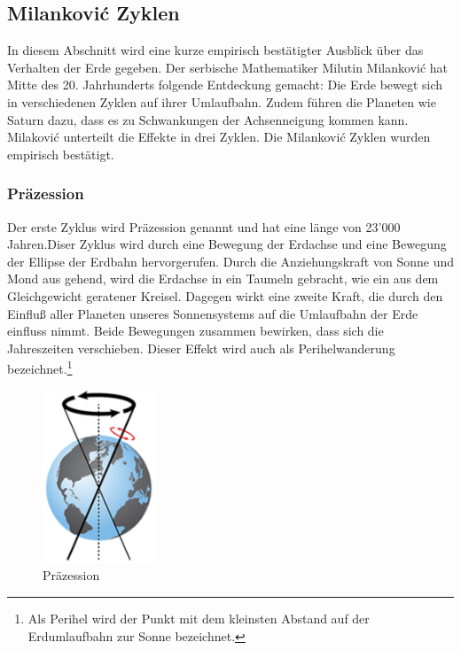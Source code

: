 \begin{refsection}
\newpage
\subsection{Milankovi\'c Zyklen}\label{sec:mil} 
In diesem Abschnitt wird eine kurze empirisch bestätigter Ausblick über das Verhalten der Erde gegeben. Der serbische Mathematiker Milutin Milankovi\'c hat Mitte des 20. Jahrhunderts folgende Entdeckung gemacht: Die Erde bewegt sich in verschiedenen Zyklen auf ihrer Umlaufbahn. Zudem führen die Planeten wie Saturn dazu, dass es zu Schwankungen der Achsenneigung kommen kann. Milakovi\'c unterteilt die Effekte in drei Zyklen. Die Milankovi\'c Zyklen wurden empirisch bestätigt.

\subsubsection{Präzession}
Der erste Zyklus wird Präzession genannt und hat eine länge von 23'000 Jahren.Diser Zyklus wird durch eine Bewegung der Erdachse und eine Bewegung der Ellipse der Erdbahn hervorgerufen. Durch die Anziehungskraft von Sonne und Mond aus gehend, wird die Erdachse in ein Taumeln gebracht, wie ein aus dem Gleichgewicht geratener Kreisel. Dagegen wirkt eine zweite Kraft, die durch den Einfluß aller Planeten unseres Sonnensystems auf die Umlaufbahn der Erde einfluss nimmt. Beide Bewegungen zusammen bewirken, dass sich die Jahreszeiten verschieben. Dieser Effekt wird auch als Perihelwanderung bezeichnet.\footnote{Als Perihel wird der Punkt mit dem kleinsten Abstand auf der Erdumlaufbahn zur Sonne bezeichnet.}
%
\begin{figure}
	\centering
	\includegraphics[width= 0.3\textwidth]{Precession.png}
	\caption[Präzession]{Präzession}
	\label{fig:abb}
\end{figure}


\end{refsection}
